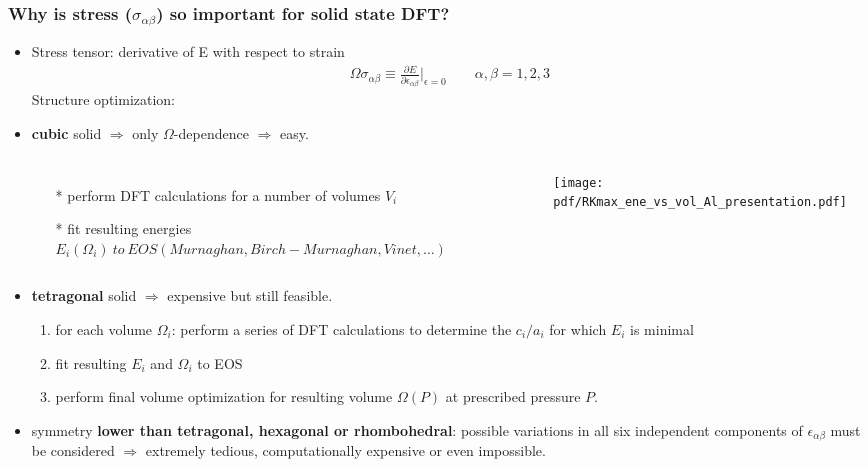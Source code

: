 \documentclass[10pt, handout]{beamer}
\newcommand{\Om}{\Omega}
\newcommand{\nologo}{\setbeamertemplate{logo}{}}  %
\begin{document}
{\nologo
	\begin{frame}
		\frametitle{Why is stress ($\sigma_{\alpha\beta}$) so important for solid state DFT?}
		\begin{itemize}
		\item Stress tensor: derivative of E with respect to strain
		\vspace{-3mm}
		\begin{eqnarray*}
			\Omega\sigma_{\alpha\beta} \equiv \frac{\partial E}{\partial \epsilon_{\alpha \beta}}\Big|_{\epsilon = 0}
			\qquad \alpha,\beta = 1,2,3
		\end{eqnarray*}
		 Structure optimization:
			\item \textbf{cubic} solid $\Rightarrow$ only $\Om$-dependence $\Rightarrow$ easy.
			\begin{columns}[c]
				\begin{enumerate}
					\item[*] perform DFT calculations for a number of volumes $V_i$
					\item[*] fit resulting energies $E_i(\Om_i) ~to~ EOS (Murnaghan, Birch-Murnaghan, Vinet,\dots)$
				\end{enumerate}
				\vspace{-5mm}
				\texttt{[image: pdf/RKmax\_ene\_vs\_vol\_Al\_presentation.pdf]}
				\vspace{-5mm}       
			\end{columns}
			\item \textbf{tetragonal} solid $\Rightarrow$ expensive but still feasible.
			\begin{enumerate}
				\item for each volume $\Om_i$: perform a series of DFT calculations to determine the $c_i/a_i$ for which $E_i$ is minimal %
				\item fit resulting $E_i$ and $\Om_i$ to EOS
				\item perform final volume optimization for resulting volume $\Om(P)$ at prescribed pressure $P$.
			\end{enumerate}
			\item symmetry \textbf{lower than tetragonal, hexagonal or rhombohedral}: possible variations in all six independent components of $\epsilon_{\alpha \beta}$ must be considered $\Rightarrow$ extremely tedious, computationally expensive or even impossible.
		\end{itemize}		
	\end{frame}
}
\end{document}
